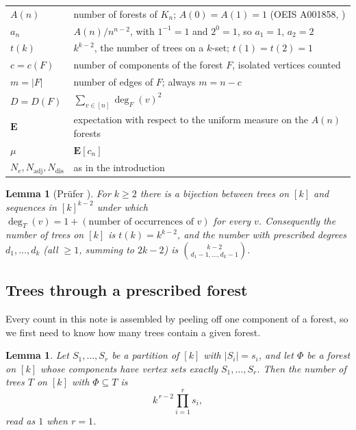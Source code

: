 \documentclass[11pt,a4paper]{amsart}
\theoremstyle{plain}
\newtheorem{lemma}[theorem]{Lemma}
\theoremstyle{definition}
\newcommand{\EX}{\mathbf{E}}
\newcommand{\dg}{\operatorname{deg}}
\newcommand{\Nc}{N}
\begin{document}
\begin{center}
\begin{tabular}{ll}
$A(n)$ & number of forests of $K_n$; $A(0)=A(1)=1$ (OEIS A001858, \cite{OEIS})\\
$a_n$ & $A(n)/n^{n-2}$, with $1^{-1}=1$ and $2^{0}=1$, so $a_1=1$, $a_2=2$\\
$t(k)$ & $k^{k-2}$, the number of trees on a $k$-set; $t(1)=t(2)=1$\\
$c = c(F)$ & number of components of the forest $F$, isolated vertices counted\\
$m = |F|$ & number of edges of $F$; always $m = n - c$\\
$D = D(F)$ & $\sum_{v\in[n]} \dg_F(v)^2$\\
$\EX$ & expectation with respect to the uniform measure on the $A(n)$ forests\\
$\mu$ & $\EX[c_n]$\\
$\Nc_e,\Nc_{\mathrm{adj}},\Nc_{\mathrm{dis}}$ & as in the introduction\\
\end{tabular}
\end{center}

\begin{lemma}[Pr\"ufer \cite{Pruefer1918}]\label{lem:prufer}
For $k \ge 2$ there is a bijection between trees on $[k]$ and sequences in
$[k]^{k-2}$ under which $\dg_T(v) = 1 + (\text{number of occurrences of } v)$ for
every $v$. Consequently the number of trees on $[k]$ is $t(k)=k^{k-2}$, and the
number with prescribed degrees $d_1,\dots,d_k$ (all $\ge 1$, summing to $2k-2$)
is $\binom{k-2}{d_1-1,\dots,d_k-1}$.
\end{lemma}

\subsection{Trees through a prescribed forest}

Every count in this note is assembled by peeling off one component of a forest,
so we first need to know how many trees contain a given forest.

\begin{lemma}\label{lem:gencayley}
Let $S_1,\dots,S_r$ be a partition of $[k]$ with $|S_i|=s_i$, and let $\Phi$ be a
forest on $[k]$ whose components have vertex sets exactly $S_1,\dots,S_r$. Then
the number of trees $T$ on $[k]$ with $\Phi \subseteq T$ is
\[
  k^{\,r-2}\prod_{i=1}^{r} s_i ,
\]
read as $1$ when $r=1$.
\end{lemma}
\end{document}
